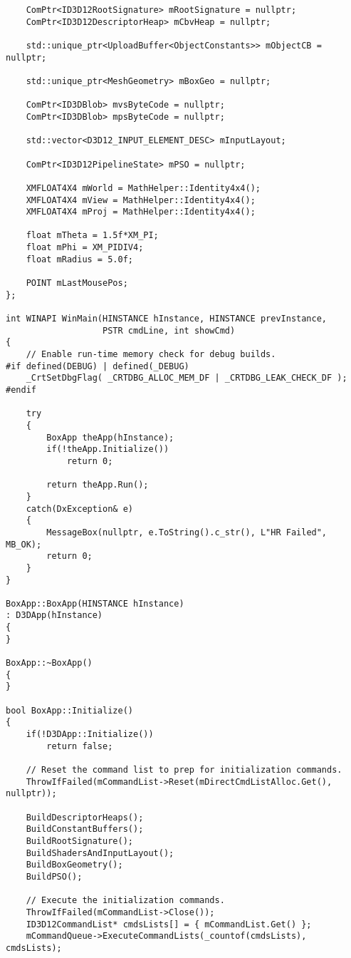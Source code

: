 \begin{lstlisting}
    ComPtr<ID3D12RootSignature> mRootSignature = nullptr;
    ComPtr<ID3D12DescriptorHeap> mCbvHeap = nullptr;

    std::unique_ptr<UploadBuffer<ObjectConstants>> mObjectCB = nullptr;

    std::unique_ptr<MeshGeometry> mBoxGeo = nullptr;

    ComPtr<ID3DBlob> mvsByteCode = nullptr;
    ComPtr<ID3DBlob> mpsByteCode = nullptr;

    std::vector<D3D12_INPUT_ELEMENT_DESC> mInputLayout;

    ComPtr<ID3D12PipelineState> mPSO = nullptr;

    XMFLOAT4X4 mWorld = MathHelper::Identity4x4();
    XMFLOAT4X4 mView = MathHelper::Identity4x4();
    XMFLOAT4X4 mProj = MathHelper::Identity4x4();

    float mTheta = 1.5f*XM_PI;
    float mPhi = XM_PIDIV4;
    float mRadius = 5.0f;

    POINT mLastMousePos;
};

int WINAPI WinMain(HINSTANCE hInstance, HINSTANCE prevInstance,
                   PSTR cmdLine, int showCmd)
{
    // Enable run-time memory check for debug builds.
#if defined(DEBUG) | defined(_DEBUG)
    _CrtSetDbgFlag( _CRTDBG_ALLOC_MEM_DF | _CRTDBG_LEAK_CHECK_DF );
#endif

    try
    {
        BoxApp theApp(hInstance);
        if(!theApp.Initialize())
            return 0;

        return theApp.Run();
    }
    catch(DxException& e)
    {
        MessageBox(nullptr, e.ToString().c_str(), L"HR Failed", MB_OK);
        return 0;
    }
}

BoxApp::BoxApp(HINSTANCE hInstance)
: D3DApp(hInstance) 
{
}

BoxApp::~BoxApp()
{
}

bool BoxApp::Initialize()
{
    if(!D3DApp::Initialize())
        return false;
        
    // Reset the command list to prep for initialization commands.
    ThrowIfFailed(mCommandList->Reset(mDirectCmdListAlloc.Get(), nullptr));
 
    BuildDescriptorHeaps();
    BuildConstantBuffers();
    BuildRootSignature();
    BuildShadersAndInputLayout();
    BuildBoxGeometry();
    BuildPSO();

    // Execute the initialization commands.
    ThrowIfFailed(mCommandList->Close());
    ID3D12CommandList* cmdsLists[] = { mCommandList.Get() };
    mCommandQueue->ExecuteCommandLists(_countof(cmdsLists), cmdsLists);


\end{lstlisting}
